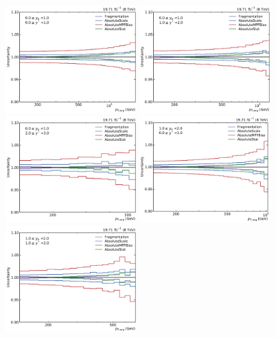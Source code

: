\begin{figure}[htbp]
    \centering
    \includegraphics[width=0.45\textwidth]{figures/measurement/jec_relunc_0_yb0ys0.pdf}\hfill
    \includegraphics[width=0.45\textwidth]{figures/measurement/jec_relunc_0_yb0ys1.pdf}
    \includegraphics[width=0.45\textwidth]{figures/measurement/jec_relunc_0_yb0ys2.pdf}\hfill
    \includegraphics[width=0.45\textwidth]{figures/measurement/jec_relunc_0_yb1ys0.pdf}
    \includegraphics[width=0.45\textwidth]{figures/measurement/jec_relunc_0_yb1ys1.pdf}\hfill

\end{figure}
